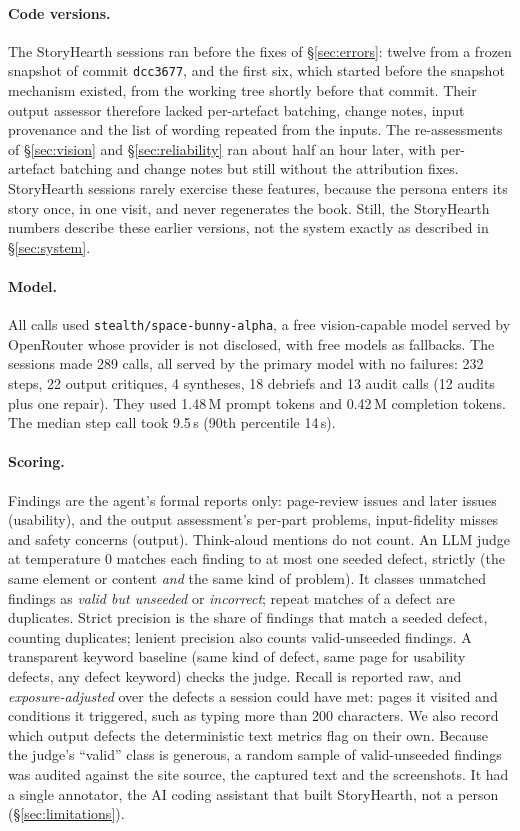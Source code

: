 \documentclass[10pt,twocolumn]{article}
\newcommand{\site}{StoryHearth}
\begin{document}
\paragraph{Code versions.} The \site{} sessions ran before the fixes of \S\ref{sec:errors}: twelve from a frozen snapshot of commit \texttt{dcc3677}, and the first six, which started before the snapshot mechanism existed, from the working tree shortly before that commit. Their output assessor therefore lacked per-artefact batching, change notes, input provenance and the list of wording repeated from the inputs. The re-assessments of \S\ref{sec:vision} and \S\ref{sec:reliability} ran about half an hour later, with per-artefact batching and change notes but still without the attribution fixes. \site{} sessions rarely exercise these features, because the persona enters its story once, in one visit, and never regenerates the book. Still, the \site{} numbers describe these earlier versions, not the system exactly as described in \S\ref{sec:system}.

\paragraph{Model.} All calls used \texttt{stealth/space-bunny-alpha}, a free vision-capable model served by OpenRouter whose provider is not disclosed, with free models as fallbacks. The \NRuns{} sessions made 289 calls, all served by the primary model with no failures: 232 steps, 22 output critiques, 4 syntheses, 18 debriefs and 13 audit calls (12 audits plus one repair). They used 1.48\,M prompt tokens and 0.42\,M completion tokens. The median step call took 9.5\,s (90th percentile 14\,s).

\paragraph{Scoring.} Findings are the agent's formal reports only: page-review issues and later issues (usability), and the output assessment's per-part problems, input-fidelity misses and safety concerns (output). Think-aloud mentions do not count. An LLM judge at temperature 0 matches each finding to at most one seeded defect, strictly (the same element or content \emph{and} the same kind of problem). It classes unmatched findings as \emph{valid but unseeded} or \emph{incorrect}; repeat matches of a defect are duplicates. Strict precision is the share of findings that match a seeded defect, counting duplicates; lenient precision also counts valid-unseeded findings. A transparent keyword baseline (same kind of defect, same page for usability defects, any defect keyword) checks the judge. Recall is reported raw, and \emph{exposure-adjusted} over the defects a session could have met: pages it visited and conditions it triggered, such as typing more than 200 characters. We also record which output defects the deterministic text metrics flag on their own. Because the judge's ``valid'' class is generous, a random sample of \AuditN{} valid-unseeded findings was audited against the site source, the captured text and the screenshots. It had a single annotator, the AI coding assistant that built \site{}, not a person (\S\ref{sec:limitations}).
\end{document}
